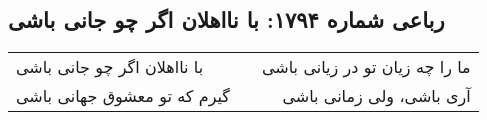 \begin{center}
\section*{رباعی شماره ۱۷۹۴: با نااهلان اگر چو جانی باشی}
\label{sec:1794}
\begin{longtable}{l p{0.5cm} r}
با نااهلان اگر چو جانی باشی
&&
ما را چه زیان تو در زیانی باشی
\\
گیرم که تو معشوق جهانی باشی
&&
آری باشی، ولی زمانی باشی
\\
\end{longtable}
\end{center}
